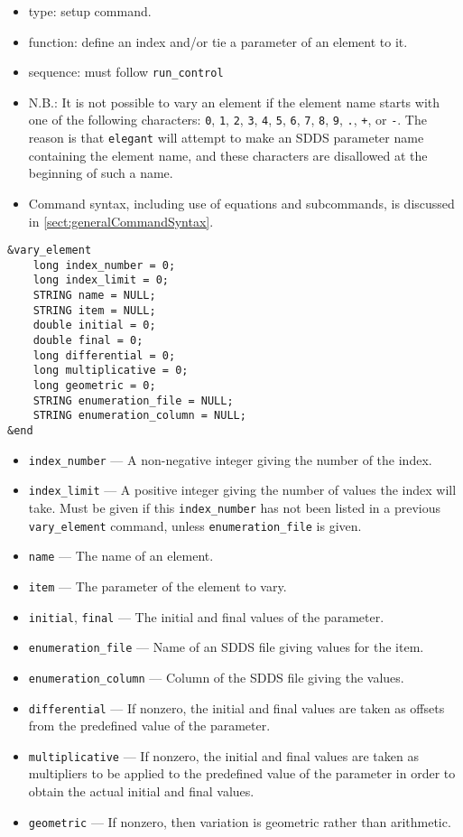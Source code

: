 \documentclass[11pt]{article}
\begin{document}
\begin{itemize}
\item type: setup command.
\item function: define an index and/or tie a parameter of an element to it.
\item sequence: must follow \verb|run_control|
\item N.B.: It is not possible to vary an element if the element name starts with one of the following
characters: 
\verb|0|, \verb|1|, \verb|2|, \verb|3|, \verb|4|, \verb|5|, \verb|6|, \verb|7|, \verb|8|,
\verb|9|, \verb|.|, \verb|+|, or \verb|-|.  The reason is that {\tt elegant} will attempt to 
make an SDDS parameter name containing the element name, and these characters are disallowed
at the beginning of such a name.
\item Command syntax, including use of equations and subcommands, is discussed in \ref{sect:generalCommandSyntax}.
\end{itemize}

\begin{verbatim}
&vary_element
    long index_number = 0;
    long index_limit = 0;
    STRING name = NULL;
    STRING item = NULL;
    double initial = 0;
    double final = 0;
    long differential = 0;
    long multiplicative = 0;
    long geometric = 0;
    STRING enumeration_file = NULL;
    STRING enumeration_column = NULL;
&end
\end{verbatim}

\begin{itemize}
\item \verb|index_number| --- A non-negative integer giving the number of the index.
\item \verb|index_limit| --- A positive integer giving the number of values the index will take.
 Must be given if this \verb|index_number| has not been listed in a previous \verb|vary_element|
command, unless \verb|enumeration_file| is given.
\item \verb|name| --- The name of an element.
\item \verb|item| --- The parameter of the element to vary.
\item \verb|initial|, \verb|final| --- The initial and final values of the parameter.
\item \verb|enumeration_file| --- Name of an SDDS file giving values for the item.
\item \verb|enumeration_column| --- Column of the SDDS file giving the values.
\item \verb|differential| --- If nonzero, the initial and final values are taken as
offsets from the predefined value of the parameter.
\item \verb|multiplicative| --- If nonzero, the initial and final values are taken as 
multipliers to be applied to the predefined value of the parameter in order to obtain
the actual initial and final values.
\item \verb|geometric| --- If nonzero, then variation is geometric rather than 
arithmetic.
\end{itemize}
\end{document}
